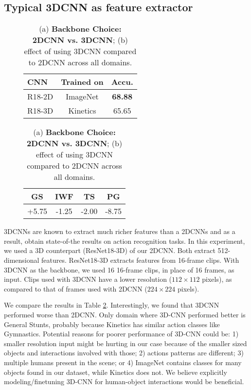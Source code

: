 \documentclass[final]{cvpr}
\begin{document}
\subsection{Typical 3DCNN as feature extractor}
\label{sec:exp_2dvs3d}
\begin{table}[]
\small
\centering
\begin{subfigure}[t]{0.45\columnwidth}
\centering
\setlength\tabcolsep{4pt}
\begin{tabular}{lcc}
\toprule
\textbf{CNN} & \textbf{Trained on} & \textbf{Accu.} \\ \midrule
R18-2D         & ImageNet & \textbf{68.88}             \\
R18-3D         & Kinetics & 65.65             \\ \bottomrule
\end{tabular}
\caption{}
\label{tab:2dvs3d_a}
\end{subfigure}
\hfill
\begin{subfigure}[t]{0.45\columnwidth}
\centering
\setlength\tabcolsep{4pt}
\begin{tabular}{@{}cccc@{}}
\toprule
\textbf{GS} & \textbf{IWF} & \textbf{TS} & \textbf{PG} \\ \midrule
+5.75       & -1.25         & -2.00        & -8.75        \\ \bottomrule
\end{tabular}
\caption{}
\label{tab:2dvs3d_b}
\end{subfigure}
\caption{(a) \textbf{Backbone Choice: 2DCNN vs. 3DCNN}; (b) effect of using 3DCNN compared to 2DCNN across all domains.}
\label{tab:2dvs3d}
\end{table}
 3DCNNs are known to extract much richer features than a 2DCNNs and as a result, obtain state-of-the results on action recognition tasks. In this experiment, we used a 3D counterpart (ResNet18-3D) of our 2DCNN. Both extract 512-dimensional features. ResNet18-3D extracts features from 16-frame clips. With 3DCNN as the backbone, we used 16 16-frame clips, in place of 16 frames, as input. Clips used with 3DCNN have a lower resolution ($112 \times 112$ pixels), as compared to that of frames used with 2DCNN ($224 \times 224$ pixels).

We compare the results in Table \ref{tab:2dvs3d}. Interestingly, we found that 3DCNN performed worse than 2DCNN. Only domain where 3D-CNN performed better is General Stunts, probably because Kinetics has similar action classes like Gymnastics. Potential reasons for poorer performance of 3D-CNN could be: 1) smaller resolution input might be hurting in our case because of the smaller sized objects and interactions involved with those; 2) actions patterns are different; 3) multiple humans present in the scene; or 4) ImageNet contains classes for many objects found in our dataset, while Kinetics does not.  We believe explicitly modeling/finetuning 3D-CNN for human-object interactions would be beneficial. 
\end{document}
